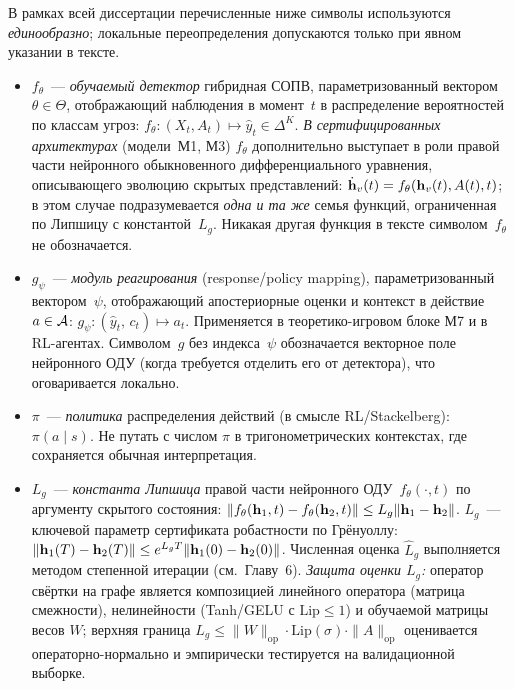 В рамках всей диссертации перечисленные ниже символы используются
\emph{единообразно}; локальные переопределения допускаются только при
явном указании в тексте.

\begin{itemize}[leftmargin=2em, itemsep=0.2em]

\item $f_\theta$~--- \emph{обучаемый детектор} гибридная СОПВ,
параметризованный вектором $\theta\in\Theta$, отображающий
наблюдения в момент~$t$ в распределение вероятностей по классам
угроз: $f_\theta:(X_t,A_t)\mapsto \hat y_t\in\Delta^{K}$. \emph{В
сертифицированных архитектурах} (модели~М1, М3) $f_\theta$
дополнительно выступает в роли правой части нейронного
обыкновенного дифференциального уравнения, описывающего эволюцию
скрытых представлений: $\dot{\mathbf{h}}_v(t)=f_\theta(\mathbf{h}_v(t),A(t),t)$;
в этом случае подразумевается \emph{одна и та же} семья функций,
ограниченная по Липшицу с константой~$L_g$. Никакая другая
функция в тексте символом~$f_\theta$ не обозначается.

\item $g_\psi$~--- \emph{модуль реагирования}
(response/policy mapping), параметризованный вектором~$\psi$,
отображающий апостериорные оценки и контекст в действие
$a\in\mathcal{A}$: $g_\psi:(\hat y_t,\,c_t)\mapsto a_t$. Применяется в
теоретико-игровом блоке М7 и в RL-агентах. Символом~$g$ без
индекса~$\psi$ обозначается векторное поле нейронного ОДУ
(когда требуется отделить его от детектора), что оговаривается
локально.

\item $\pi$~--- \emph{политика} распределения действий
(в смысле RL/Stackelberg): $\pi(a\mid s)$. Не путать с числом
$\pi$ в тригонометрических контекстах, где сохраняется обычная
интерпретация.

\item $L_g$~--- \emph{константа Липшица} правой части нейронного
ОДУ~$f_\theta(\cdot,t)$ по аргументу скрытого состояния:
$\|f_\theta(\mathbf{h}_1,t)-f_\theta(\mathbf{h}_2,t)\|\le L_g\|\mathbf{h}_1-\mathbf{h}_2\|$.
$L_g$~--- ключевой параметр сертификата робастности по Грёнуоллу:
$\|\mathbf{h}_1(T)-\mathbf{h}_2(T)\|\le e^{L_g T}\|\mathbf{h}_1(0)-\mathbf{h}_2(0)\|$.
Численная оценка $\hat L_g$ выполняется методом степенной
итерации (см.~Главу~6). \emph{Защита оценки $L_g$:} оператор
свёртки на графе является композицией линейного оператора
(матрица смежности), нелинейности (Tanh/GELU с
$\mathrm{Lip}\le 1$) и обучаемой матрицы весов $W$; верхняя граница
$L_g\le \|W\|_{\mathrm{op}}\cdot \mathrm{Lip}(\sigma)\cdot
\|A\|_{\mathrm{op}}$ оценивается операторно-нормально и
эмпирически тестируется на валидационной выборке.


\end{itemize}
